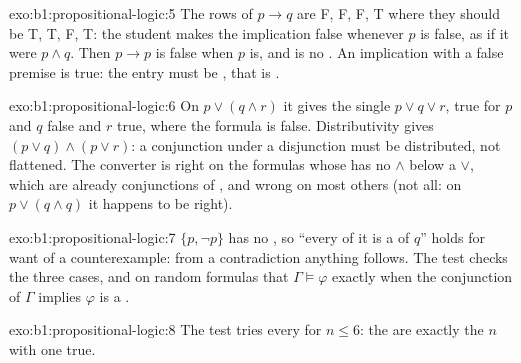 \begin{solution}{exo:b1:propositional-logic:5}
The rows of $p \rightarrow q$ are F, F, F, T where they should be T, T, F, T: the student makes the implication false
whenever $p$ is false, as if it were $p \wedge q$. Then $p \rightarrow p$ is false when $p$ is, and is no . An
implication with a false premise is true: the entry must be , that is
.
\end{solution}

\begin{solution}{exo:b1:propositional-logic:6}
On $p \vee (q \wedge r)$ it gives the single  $p \vee q \vee r$, true for $p$ and $q$ false and $r$ true, where the
formula is false. Distributivity gives $(p \vee q) \wedge (p \vee r)$: a conjunction under a disjunction must be
distributed, not flattened. The converter is right on the formulas whose  has no $\wedge$
below a $\vee$, which are already conjunctions of , and wrong on most others (not all:
on $p \vee (q \wedge q)$ it happens to be right).
\end{solution}

\begin{solution}{exo:b1:propositional-logic:7}
$\{p, \neg p\}$ has no , so ``every  of it is a  of $q$'' holds for want of a counterexample: from a
contradiction anything follows. The test  checks the three cases, and on random formulas
that $\Gamma \models \varphi$ exactly when the conjunction of $\Gamma$ implies $\varphi$ is a .
\end{solution}

\begin{solution}{exo:b1:propositional-logic:8}
The test  tries every  for $n \leq 6$: the  are exactly the $n$ 
with one  true.
\end{solution}

